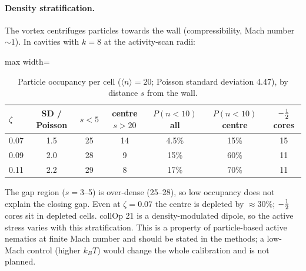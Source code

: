 \paragraph{Density stratification.} \SIcand The vortex centrifuges particles towards the wall (compressibility, Mach number
$\sim1$). In cavities with $k=8$ at the activity-scan radii:
\begin{table}[H]\centering\small
\caption{Particle occupancy per cell ($\langle n\rangle=20$; Poisson standard deviation 4.47), by distance $s$ from the wall.}\label{tab:dens}
\begin{adjustbox}{max width=\textwidth}
\begin{tabular}{lcccccc}\toprule
$\zeta$ & SD / Poisson & $s<5$ & centre $s>20$ & $P(n<10)$ all & $P(n<10)$ centre & $-\tfrac12$ cores\\\midrule
0.07 & 1.5 & 25 & 14 & 4.5\% & 15\% & 15\\
0.09 & 2.0 & 28 & 9 & 15\% & 60\% & 11\\
0.11 & 2.2 & 29 & 8 & 17\% & 70\% & 11\\\bottomrule
\end{tabular}
\end{adjustbox}
\end{table}
The gap region ($s=3$--5) is over-dense (25--28), so low occupancy does not explain the closing gap. Even at $\zeta=0.07$ the
centre is depleted by $\approx30\%$; $-\tfrac12$ cores sit in depleted cells. collOp 21 is a density-modulated dipole, so the active
stress varies with this stratification. This is a property of particle-based active nematics at finite Mach number and should
be stated in the methods; a low-Mach control (higher $k_BT$) would change the whole calibration and is not planned.

